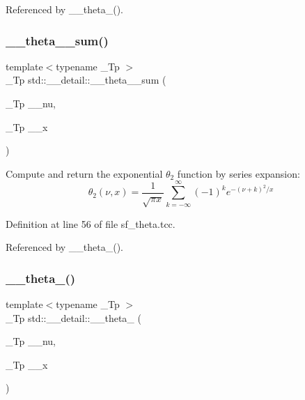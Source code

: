 Referenced by \+\_\+\+\_\+theta\+\_().

\mbox{\label{namespacestd_1_1____detail_af434f6a07d92577f40f352aa3d44483c}} 
\subsubsection{\texorpdfstring{\+\_\+\+\_\+theta\+\_\+\_\+sum()}{\_\_theta\_2\_sum()}}
{\footnotesize\ttfamily template$<$typename \+\_\+\+Tp $>$ \\
\+\_\+\+Tp std\+::\+\_\+\+\_\+detail\+::\+\_\+\+\_\+theta\+\_\+\_\+sum (\begin{DoxyParamCaption}\item[{\+\_\+\+Tp}]{\+\_\+\+\_\+nu,  }\item[{\+\_\+\+Tp}]{\+\_\+\+\_\+x }\end{DoxyParamCaption})}

Compute and return the exponential $ \theta_2 $ function by series expansion\+: \[ \theta_2(\nu, x) = \frac{1}{\sqrt{\pi x}} \sum_{k=-\infty}^{\infty}(-1)^k e^{-(\nu+k)^2/x} \] 

Definition at line 56 of file sf\+\_\+theta.\+tcc.



Referenced by \+\_\+\+\_\+theta\+\_().

\mbox{\label{namespacestd_1_1____detail_a6f965c639307555e5979b954a11ca0b8}} 
\subsubsection{\texorpdfstring{\+\_\+\+\_\+theta\+\_()}{\_\_theta\_3()}}
{\footnotesize\ttfamily template$<$typename \+\_\+\+Tp $>$ \\
\+\_\+\+Tp std\+::\+\_\+\+\_\+detail\+::\+\_\+\+\_\+theta\+\_ (\begin{DoxyParamCaption}\item[{\+\_\+\+Tp}]{\+\_\+\+\_\+nu,  }\item[{\+\_\+\+Tp}]{\+\_\+\+\_\+x }\end{DoxyParamCaption})}

